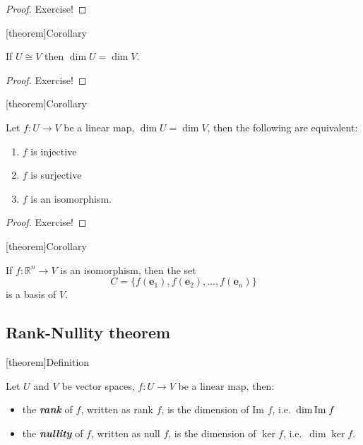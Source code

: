 \documentclass[12pt]{report}
\theoremstyle{definition}
\begin{document}
\begin{proof}
    Exercise!
\end{proof}

[theorem]{Corollary}
\begin{isomorphic vector spaces have the same dimension}
    If $U \cong V$ then $\dim{U} = \dim{V}$.
\end{isomorphic vector spaces have the same dimension}

\begin{proof}
    Exercise!
\end{proof}

[theorem]{Corollary}
\begin{linear map over two V of same dim}
    Let $f:U\rightarrow{}V$ be a linear map, $\dim{U} = \dim{V}$, then the following are equivalent:
    \begin{enumerate}[label = (\roman*)]
        \item $f$ is injective
        \item $f$ is surjective
        \item $f$ is an isomorphism.
    \end{enumerate}
\end{linear map over two V of same dim}

\begin{proof}
    Exercise!
\end{proof}

[theorem]{Corollary}
\begin{find basis in new vector space}
    If $f:\mathbb{R}^{n}\rightarrow{}V$ is an isomorphism, then the set\[
        C = \{f(\mathbf{e}_1), f(\mathbf{e}_2),\ldots, f(\mathbf{e}_n)\}
    \]is a basis of $V$.
\end{find basis in new vector space}

\subsection{Rank-Nullity theorem}

[theorem]{Definition}
\begin{def of rank and nullity}
    Let $U$ and $V$ be vector spaces, $f:U\rightarrow{}V$ be a linear map, then:
    \begin{itemize}
        \item the \textbf{\emph{rank}} of $f$, written as rank $f$,
            is the dimension of Im $f$, i.e.\ $\dim{\textnormal{Im}\; f}$
        \item the \textbf{\emph{nullity}} of $f$, written as null $f$,
            is the dimension of $\ker{f}$, i.e.\ $\dim{\ker{f}}$.
    \end{itemize}
\end{def of rank and nullity}
\end{document}
